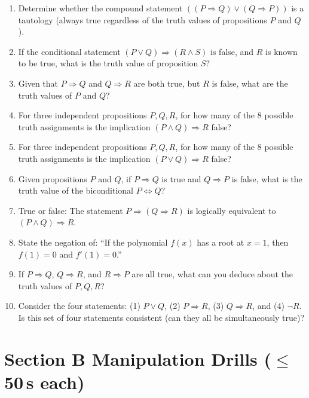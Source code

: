\documentclass[11pt,a4paper]{article}
\begin{document}
\begin{enumerate}

\item Determine whether the compound statement $((P \Rightarrow Q) \lor (Q \Rightarrow P))$ is a tautology (always true regardless of the truth values of propositions $P$ and $Q$).

\item If the conditional statement $(P \lor Q) \Rightarrow (R \land S)$ is false, and $R$ is known to be true, what is the truth value of proposition $S$?

\item Given that $P \Rightarrow Q$ and $Q \Rightarrow R$ are both true, but $R$ is false, what are the truth values of $P$ and $Q$?

\item For three independent propositions $P, Q, R$, for how many of the $8$ possible truth assignments is the implication $(P \land Q) \Rightarrow R$ false?

\item For three independent propositions $P, Q, R$, for how many of the $8$ possible truth assignments is the implication $(P \lor Q) \Rightarrow R$ false?

\item Given propositions $P$ and $Q$, if $P \Rightarrow Q$ is true and $Q \Rightarrow P$ is false, what is the truth value of the biconditional $P \iff Q$?

\item True or false: The statement $P \Rightarrow (Q \Rightarrow R)$ is logically equivalent to $(P \land Q) \Rightarrow R$.

\item State the negation of: ``If the polynomial $f(x)$ has a root at $x=1$, then $f(1)=0$ and $f'(1)=0$.''

\item If $P \Rightarrow Q$, $Q \Rightarrow R$, and $R \Rightarrow P$ are all true, what can you deduce about the truth values of $P, Q, R$?

\item Consider the four statements: (1) $P \lor Q$, (2) $P \Rightarrow R$, (3) $Q \Rightarrow R$, and (4) $\neg R$. Is this set of four statements consistent (can they all be simultaneously true)?

\end{enumerate}

\section*{Section B \quad Manipulation Drills \hfill{\normalfont\small($\leq$50\,s each)}}
\end{document}

